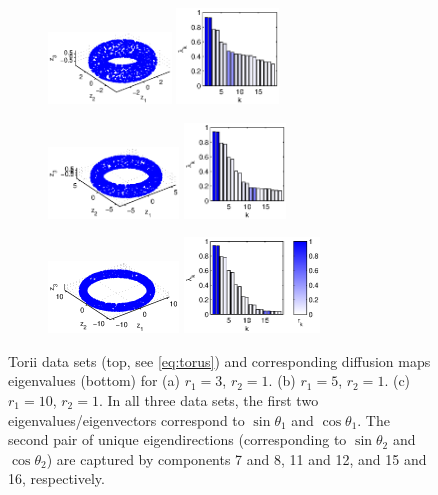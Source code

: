 \begin{figure}[t]
\centering
\begin{subfigure}{1.5in}
\centering
\includegraphics[height=0.75in]{torus1}
\includegraphics[height=1in]{torus1_evals}
\caption{}
\end{subfigure}
%
%
\begin{subfigure}{1.5in}
\centering
\includegraphics[height=0.75in]{torus2}
\includegraphics[height=1in]{torus2_evals}
\caption{}
\end{subfigure}
%
%
\begin{subfigure}{1.5in}
\centering
\includegraphics[height=0.75in]{torus3}
\includegraphics[height=1in]{torus3_evals}
\caption{}
\end{subfigure}
%
\hfill
%
\caption{Torii data sets (top, see \eqref{eq:torus}) and corresponding diffusion maps eigenvalues (bottom) for (a) $r_1 = 3$, $r_2 = 1$. (b) $r_1 = 5$, $r_2 = 1$. (c) $r_1 = 10$, $r_2 = 1$. In all three data sets, the first two eigenvalues/eigenvectors correspond to $\sin \theta_1$ and $\cos \theta_1$. The second pair of unique eigendirections (corresponding to $\sin \theta_2$ and $\cos \theta_2$) are captured by components 7 and 8, 11 and 12, and 15 and 16, respectively.}
%
\label{fig:torus}
%
\end{figure}

